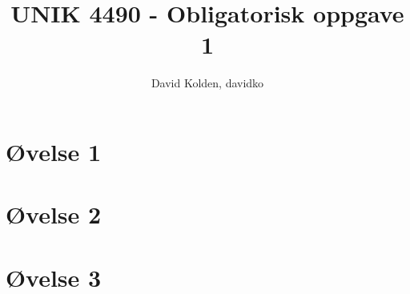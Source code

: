 \documentclass[norsk]{article}
\author{David Kolden, davidko}
\title{UNIK 4490 - Obligatorisk oppgave 1}
\begin{document}
\maketitle
\section{Øvelse 1}
\subsection{ }
\subsection{ }
\subsection{ }
\subsection{ }
\subsection{ }
\section{Øvelse 2}

\section{Øvelse 3}
\subsection{ }
\subsection{ }
\subsection{ }
\subsection{ }
\subsection{ }
\subsection{ }
\subsection{ }
\subsection{ }
\end{document}
